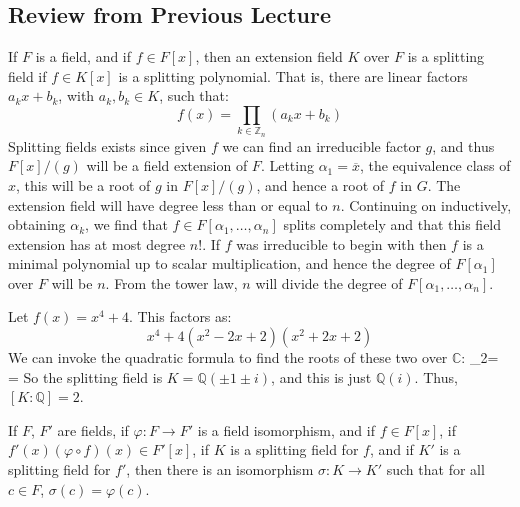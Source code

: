     \subsection{Review from Previous Lecture}
        If $F$ is a field, and if $f\in{F}[x]$, then an extension field
        $K$ over $F$ is a splitting field if $f\in{K}[x]$ is a splitting
        polynomial. That is, there are linear factors
        $a_{k}x+b_{k}$, with $a_{k},b_{k}\in{K}$, such that:
        \begin{equation}
            f(x)=\prod_{k\in\mathbb{Z}_{n}}(a_{k}x+b_{k})
        \end{equation}
        Splitting fields exists since given $f$ we can find an irreducible
        factor $g$, and thus $F[x]/(g)$ will be a field extension of $F$.
        Letting $\alpha_{1}=\overline{x}$, the equivalence class of $x$,
        this will be a root of $g$ in $F[x]/(g)$, and hence a root of
        $f$ in $G$. The extension field will have degree less than or equal
        to $n$. Continuing on inductively, obtaining $\alpha_{k}$, we find
        that $f\in{F}[\alpha_{1},\dots,\alpha_{n}]$ splits completely and
        that this field extension has at most degree $n!$. If $f$ was
        irreducible to begin with then $f$ is a minimal polynomial up to
        scalar multiplication, and hence the degree of $F[\alpha_{1}]$ over
        $F$ will be $n$. From the tower law, $n$ will divide the degree of
        $F[\alpha_{1},\dots,\alpha_{n}]$.
        \begin{example}
            Let $f(x)=x^{4}+4$. This factors as:
            \begin{equation}
                x^{4}+4(x^{2}-2x+2)(x^{2}+2x+2)
            \end{equation}
            We can invoke the quadratic formula to find the roots of these
            two over $\mathbb{C}$:
            {
                \alpha_{2}=
                          =
            }
            So the splitting field is $K=\mathbb{Q}(\pm{1}\pm{i})$, and this
            is just $\mathbb{Q}(i)$. Thus, $[K:\mathbb{Q}]=2$.
        \end{example}
        \begin{theorem}
            If $F$, $F'$ are fields, if $\varphi:F\rightarrow{F}'$ is
            a field isomorphism, and if $f\in{F}[x]$, if
            $f'(x)(\varphi\circ{f})(x)\in{F}'[x]$, if $K$ is a splitting
            field for $f$, and if $K'$ is a splitting field for
            $f'$, then there is an isomorphism $\sigma:K\rightarrow{K}'$
            such that for all $c\in{F}$, $\sigma(c)=\varphi(c)$.
        \end{theorem}

